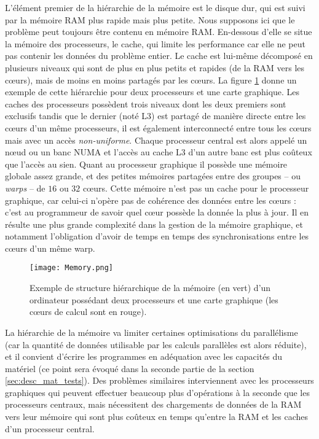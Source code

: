 L'élément premier de la hiérarchie de la mémoire est le disque dur, qui est suivi par la mémoire RAM plus rapide mais plus petite. Nous supposons ici que le problème peut toujours être contenu en mémoire RAM. En-dessous d'elle se situe la mémoire des processeurs, le cache, qui limite les performance car elle ne peut pas contenir les données du problème entier. Le cache est lui-même décomposé en plusieurs niveaux qui sont de plus en plus petits et rapides (de la RAM vers les cœurs), mais de moins en moins partagés par les cœurs. La figure \ref{fig:memoire_base} donne un exemple de cette hiérarchie pour deux processeurs et une carte graphique. Les caches des processeurs possèdent trois niveaux dont les deux premiers sont exclusifs tandis que le dernier (noté L3) est partagé de manière directe entre les cœurs d'un même processeurs, il est également interconnecté entre tous les cœurs mais avec un accès \emph{non-uniforme}. Chaque processeur central est alors appelé un nœud ou un banc NUMA et l'accès au cache L3 d'un autre banc est plus coûteux que l'accès au sien. Quant au processeur graphique il possède une mémoire globale assez grande, et des petites mémoires partagées entre des groupes -- ou \emph{warps} -- de $16$ ou $32$ cœurs. Cette mémoire n'est pas un cache pour le processeur graphique, car celui-ci n'opère pas de cohérence des données entre les cœurs : c'est au programmeur de savoir quel cœur possède la donnée la plus à jour. Il en résulte une plus grande complexité dans la gestion de la mémoire graphique, et notamment l'obligation d'avoir de temps en temps des synchronisations entre les cœurs d'un même warp. 

\begin{figure}[!h]
  \caption{Exemple de structure hiérarchique de la mémoire (en vert) d'un ordinateur possédant deux processeurs et une carte graphique (les cœurs de calcul sont en rouge).}
  \label{fig:memoire_base}
  \texttt{[image: Memory.png]}
\end{figure}

La hiérarchie de la mémoire va limiter certaines optimisations du parallélisme (car la quantité de données utilisable par les calculs parallèles est alors réduite), et il convient d'écrire les programmes en adéquation avec les capacités du matériel (ce point sera évoqué dans la seconde partie de la section \ref{sec:desc_mat_tests}). Des problèmes similaires interviennent avec les processeurs graphiques qui peuvent effectuer beaucoup plus d'opérations à la seconde que les processeurs centraux, mais nécessitent des chargements de données de la RAM vers leur mémoire qui sont plus coûteux en temps qu'entre la RAM et les caches d'un processeur central.

